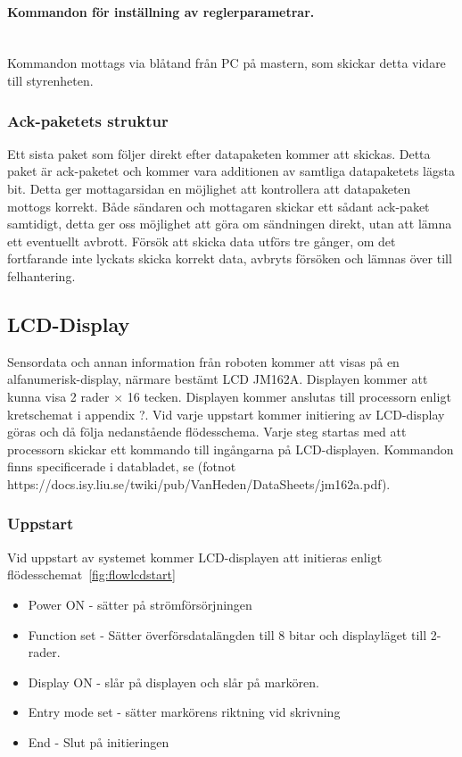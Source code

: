 \documentclass[a4paper,12pt,fleqn]{article}
\begin{document}
\paragraph{Kommandon för inställning av reglerparametrar.}
~\\
Kommandon mottags via blåtand från PC på mastern, som skickar detta vidare till styrenheten. 


\subsubsection{Ack-paketets struktur}
Ett sista paket som följer direkt efter datapaketen kommer att skickas. Detta paket är ack-paketet och kommer vara additionen av samtliga datapaketets lägsta bit. Detta ger mottagarsidan en möjlighet att kontrollera att datapaketen mottogs korrekt.
Både sändaren och mottagaren skickar ett sådant ack-paket samtidigt, detta ger oss möjlighet att göra om sändningen direkt, utan att lämna ett eventuellt avbrott. Försök att skicka data utförs tre gånger, om det fortfarande inte lyckats skicka korrekt data, avbryts försöken och lämnas över till felhantering. 

\subsection{LCD-Display}
Sensordata och annan information från roboten kommer att visas på en alfanumerisk-display, närmare bestämt  LCD JM162A. Displayen kommer att kunna visa 2 rader × 16 tecken.
Displayen kommer anslutas till processorn enligt kretschemat i appendix ?. 
Vid varje uppstart kommer initiering av LCD-display göras och då följa nedanstående flödesschema. Varje steg startas med att processorn skickar ett kommando till ingångarna på LCD-displayen. Kommandon finns specificerade i databladet, se (fotnot https://docs.isy.liu.se/twiki/pub/VanHeden/DataSheets/jm162a.pdf). 

\subsubsection{Uppstart}
	
Vid uppstart av systemet kommer LCD-displayen att initieras enligt flödesschemat~\ref{fig:flowlcdstart}

\begin{itemize}
  \item Power ON - sätter på strömförsörjningen
  \item Function set - Sätter överförsdatalängden till 8 bitar och displayläget till 2-rader.
  \item Display ON - slår på displayen och slår på markören. 
  \item Entry mode set - sätter markörens riktning vid skrivning
  \item End - Slut på initieringen
\end{itemize}
\end{document}
